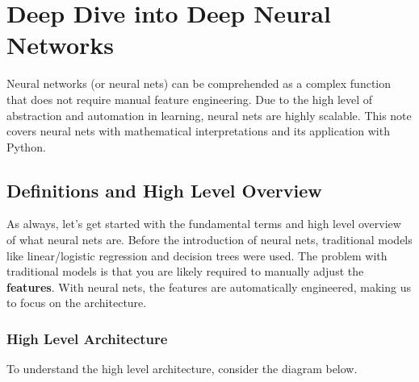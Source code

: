 \documentclass[../../main.tex]{subfiles}
\begin{document}
\chapter{Deep Dive into Deep Neural Networks}

Neural networks (or neural nets) can be comprehended as a complex
function that does not require manual feature engineering.
Due to the high level of abstraction and automation in learning,
neural nets are highly scalable. This note covers neural nets with
mathematical interpretations and its application with Python.

\section{Definitions and High Level Overview}

As always, let's get started with the fundamental terms and high
level overview of what neural nets are. Before the introduction
of neural nets, traditional models like linear/logistic regression
and decision trees were used. The problem with traditional models
is that you are likely required to manually adjust the
\textbf{features}. With neural nets, the features are automatically
engineered, making us to focus on the architecture.

\subsection{High Level Architecture}
To understand the high level architecture, consider the diagram below.
\end{document}
